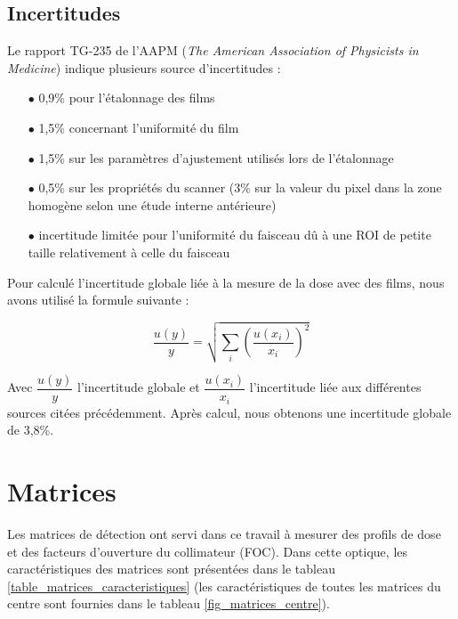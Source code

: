 \documentclass{book}
\begin{document}
\subsection{Incertitudes}

Le rapport TG-235 de l'AAPM \cite{niroomand2020report} (\textit{The American Association of Physicists in Medicine}) indique plusieurs source d'incertitudes :

\begin{itemize}
  \item[$\bullet$] 0,9\% pour l'étalonnage des films
  \item[$\bullet$] 1,5\% concernant l'uniformité du film
  \item[$\bullet$] 1,5\% sur les paramètres d'ajustement utilisés lors de l'étalonnage
  \item[$\bullet$] 0,5\% sur les propriétés du scanner (3\% sur la valeur du pixel dans la zone homogène selon une étude interne antérieure)
  \item[$\bullet$] incertitude limitée pour l'uniformité du faisceau dû à une ROI de petite taille relativement à celle du faisceau
\end{itemize}

Pour calculé l'incertitude globale liée à la mesure de la dose avec des films, nous avons utilisé la formule suivante :

\begin{equation}
 \dfrac{u(y)}{y} = \sqrt{\sum\limits_i \left(\dfrac{u(x_i)}{x_i}\right)^2}
\end{equation}

Avec $\dfrac{u(y)}{y}$ l'incertitude globale et $\dfrac{u(x_i)}{x_i}$ l'incertitude liée aux différentes sources citées précédemment. Après calcul, nous obtenons une incertitude globale de 3,8\%.

\section{Matrices}

Les matrices de détection ont servi dans ce travail à mesurer des profils de dose et des facteurs d'ouverture du collimateur (FOC). Dans cette optique, les caractéristiques des matrices sont présentées dans le tableau \ref*{table_matrices_caracteristiques} (les caractéristiques de toutes les matrices du centre sont fournies dans le tableau \ref*{fig_matrices_centre}).
\end{document}
